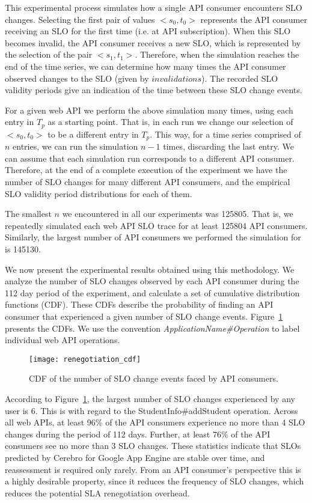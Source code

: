 This experimental process simulates how a single API consumer encounters SLO changes.
Selecting the first pair of values $<s_{0},t_{0}>$ represents
the API consumer receiving an SLO for the first time (i.e. at API subscription). 
When this SLO becomes invalid, the API consumer
receives a new SLO, which is represented by the selection of the pair $<s_{1},t_{1}>$. 
Therefore, when the simulation reaches the end of the time series, we can determine how many times the
API consumer observed changes to the SLO (given by $invalidations$). The
recorded SLO validity periods give an indication of the time between these SLO change events.

For a given web API we perform the above simulation many times, using each entry in $T_{p}$ as
a starting point. That is, in each run we change our selection of $<s_{0},t_{0}>$ to be a different
entry in $T_{p}$. This way, for a time series comprised of $n$ entries, we can run the simulation 
$n-1$ times, discarding the last entry. We can assume that each simulation run corresponds to a different API
consumer. Therefore, at the end of a complete execution of the experiment we have the number of SLO
changes for many different API consumers, and the empirical SLO validity period distributions 
for each of them. 

The smallest $n$ we encountered in all our experiments was 125805. That is, we
repeatedly simulated each web API SLO trace 
for at least 125804 API consumers. Similarly, the largest number of API consumers 
we performed the simulation for is 145130.

We now present the experimental results obtained using this methodology. We
analyze the number of SLO changes observed by each API consumer during the 112 day
period of the experiment, and calculate a set of cumulative distribution functions (CDF). These
CDFs describe the probability of finding an API consumer that experienced a given number of
SLO  change events. Figure~\ref{fig:renegotiation_cdf} presents the CDFs. We use the convention
\textit{ApplicationName\#Operation} to label individual web API operations.

\begin{figure}
\centering
\texttt{[image: renegotiation\_cdf]}
\caption{CDF of the number of SLO change events faced by API consumers.}
\label{fig:renegotiation_cdf}
\end{figure}

According to Figure~\ref{fig:renegotiation_cdf}, the largest number of SLO changes
experienced by any user is 6. This is
with regard to the StudentInfo\#addStudent operation. Across all web APIs, at least 96\% of the API
consumers experience no more than 4 SLO changes during the period of 112 days. Further,
at least 76\% of the API consumers see no more than 3 SLO changes. These statistics
indicate that SLOs predicted by Cerebro for Google App Engine are
stable over time, and reassessment is required only rarely. From an API consumer's perspective
this is a highly desirable property, since it reduces the frequency of SLO changes, which
reduces the potential SLA renegotiation overhead.

